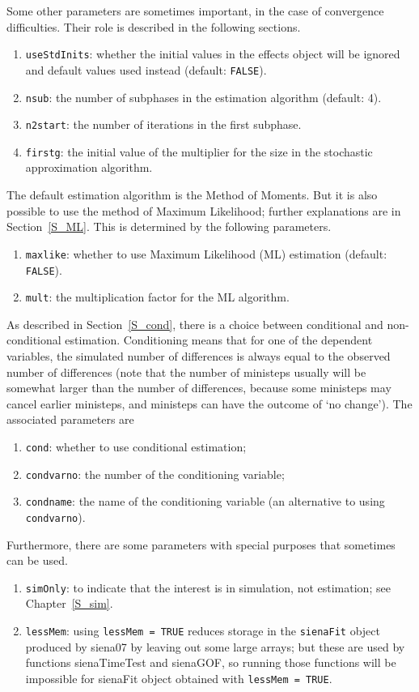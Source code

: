 \documentclass[a4paper,fleqn,11pt]{article}
\newcommand{\+}{\, + \,}
\newcommand{\sfn}[1]{\textsf{#1}}
\begin{document}
Some other parameters are sometimes important, in the case of convergence
difficulties.  Their role is described in the following sections.
\begin{enumerate}[resume]
  \item \texttt{useStdInits}: whether the initial values in the effects
    object will be ignored and default values used instead (default: \texttt{FALSE}).
  \item \texttt{nsub}:  the number of subphases in the estimation algorithm
    (default: 4).
  \item \texttt{n2start}: the number of iterations in the first subphase.
  \item \texttt{firstg}: the initial value of the multiplier for the size in the
       stochastic approximation algorithm.
\end{enumerate}
The default estimation algorithm is the Method of Moments. But it is also possible
to use the method of Maximum Likelihood; further explanations are in Section~\ref{S_ML}.
This is determined by the following parameters.
\begin{enumerate}[resume]
  \item \texttt{maxlike}: whether to use Maximum Likelihood (ML) estimation
       (default: \texttt{FALSE}).
  \item \texttt{mult}: the multiplication factor for the ML algorithm.
\end{enumerate}
As described in Section~\ref{S_cond}, there is a choice between conditional
and non-conditional estimation. Conditioning means that for one of the
dependent variables, the simulated number of differences is always equal to
the observed number of differences (note that the number of ministeps usually will
be somewhat larger than the number of differences, because some ministeps
may cancel earlier ministeps, and ministeps can have the outcome of
`no change'). The associated parameters are
\begin{enumerate}[resume]
  \item \texttt{cond}: whether to use conditional estimation;
  \item \texttt{condvarno}: the number of the conditioning variable;
  \item \texttt{condname}: the name of the conditioning variable (an alternative
      to using \texttt{condvarno}).
\end{enumerate}
Furthermore, there are some parameters with special purposes that sometimes
can be used.
\begin{enumerate}[resume]
  \item \texttt{simOnly}: to indicate that the interest is in simulation,
       not estimation; see Chapter~\ref{S_sim}.
  \item \texttt{lessMem}: using \texttt{lessMem = TRUE} reduces storage in
      the \texttt{sienaFit} object produced by \textsf{siena07} by leaving out
      some large arrays; but these are used by functions
     \textsf{sienaTimeTest} and \textsf{sienaGOF}, so running those functions will be impossible
     for \sfn{sienaFit} object obtained with \texttt{lessMem = TRUE}.
\end{enumerate}
\end{document}
